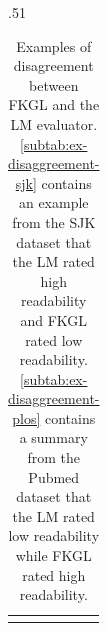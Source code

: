 \begin{table}[!t]
\begin{subtable}[t]{.51\textwidth}
\begin{tabular}{p{}}
{        %
        }
        \end{tabular}
        \caption{FKGL = 10.0 (10th grade), \\LM score = 1/5.}
        \label{subtab:ex-disaggreement-plos}
    \end{subtable} 
    \caption{Examples of disagreement between FKGL and the LM evaluator. \ref{subtab:ex-disaggreement-sjk} contains an example from the SJK dataset that the LM rated high readability and FKGL rated low readability. \ref{subtab:ex-disaggreement-plos} contains a summary from the Pubmed dataset that the LM rated low readability while FKGL rated high readability.}
    \label{tab:disagreement-example}
\end{table}